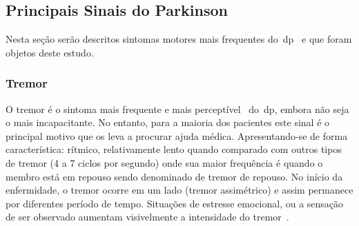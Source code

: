 \subsection{Principais Sinais do Parkinson}
Nesta seção serão descritos sintomas motores mais frequentes do~\ac{dp}~\cite{protpar010} e que foram objetos deste estudo. %
%

\subsubsection{Tremor}\label{sec:tremor}
O tremor é o sintoma mais frequente e mais perceptível~\cite{limongi2002} do~\ac{dp}, embora não seja o mais incapacitante. No entanto, para a maioria dos pacientes este sinal é o principal motivo que os leva a procurar ajuda médica. Apresentando-se de forma característica: rítmico, relativamente lento quando comparado com outros tipos de tremor (4 a 7 ciclos por segundo) onde sua maior frequência é quando o membro está em repouso sendo denominado de tremor de repouso. No início da enfermidade, o tremor ocorre em um lado (tremor assimétrico) e assim permanece por diferentes período de tempo. Situações de estresse emocional, ou a sensação de ser observado aumentam visivelmente a intensidade do tremor~\cite{jankovic2008}. 

